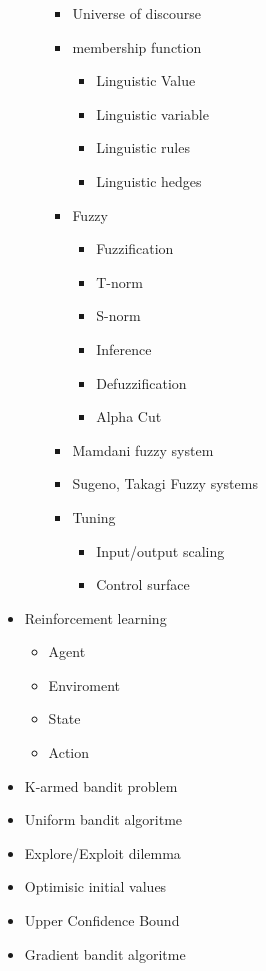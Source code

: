 \documentclass[a4paper,11pt]{article}
\begin{document}
\begin{itemize}
\begin{itemize}
\begin{itemize}
                    \item Universe of discourse
                    \item membership function
                        \begin{itemize}
                            \item Linguistic Value
                            \item Linguistic variable
                            \item Linguistic rules
                            \item Linguistic hedges
                        \end{itemize}
                    \item Fuzzy
                        \begin{itemize}
                            \item Fuzzification 
                            \item T-norm
                            \item S-norm
                            \item Inference
                            \item Defuzzification
                            \item Alpha Cut
                                
                        \end{itemize}
                    \item Mamdani fuzzy system
                    \item Sugeno, Takagi Fuzzy systems
                    \item Tuning
                        \begin{itemize}
                            \item Input/output scaling
                            \item Control surface
                        \end{itemize}
                \end{itemize}
        \end{itemize}
        
    \item Reinforcement learning
        \begin{itemize}
            \item Agent
            \item Enviroment
            \item State
            \item Action
        \end{itemize}
    \item K-armed bandit problem
    \item Uniform bandit algoritme
    \item Explore/Exploit dilemma
    \item Optimisic initial values
    \item Upper Confidence Bound
    \item Gradient bandit algoritme
\end{itemize}
\end{document}
